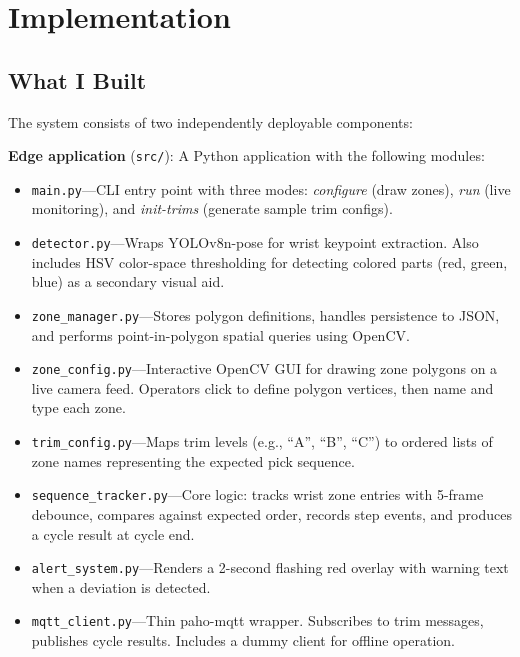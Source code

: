 \documentclass[conference]{IEEEtran}
\begin{document}
\section{Implementation}

\subsection{What I Built}
The system consists of two independently deployable components:

\textbf{Edge application} (\texttt{src/}): A Python application with the following modules:
\begin{itemize}
    \item \texttt{main.py}---CLI entry point with three modes: \textit{configure} (draw zones), \textit{run} (live monitoring), and \textit{init-trims} (generate sample trim configs).
    \item \texttt{detector.py}---Wraps YOLOv8n-pose for wrist keypoint extraction. Also includes HSV color-space thresholding for detecting colored parts (red, green, blue) as a secondary visual aid.
    \item \texttt{zone\_manager.py}---Stores polygon definitions, handles persistence to JSON, and performs point-in-polygon spatial queries using OpenCV.
    \item \texttt{zone\_config.py}---Interactive OpenCV GUI for drawing zone polygons on a live camera feed. Operators click to define polygon vertices, then name and type each zone.
    \item \texttt{trim\_config.py}---Maps trim levels (e.g., ``A'', ``B'', ``C'') to ordered lists of zone names representing the expected pick sequence.
    \item \texttt{sequence\_tracker.py}---Core logic: tracks wrist zone entries with 5-frame debounce, compares against expected order, records step events, and produces a cycle result at cycle end.
    \item \texttt{alert\_system.py}---Renders a 2-second flashing red overlay with warning text when a deviation is detected.
    \item \texttt{mqtt\_client.py}---Thin paho-mqtt wrapper. Subscribes to trim messages, publishes cycle results. Includes a dummy client for offline operation.
\end{itemize}
\end{document}
